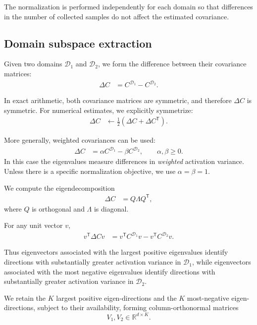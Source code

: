 \documentclass[11pt,a4paper]{article}
\begin{document}
The normalization is performed independently for each domain so that
differences in the number of collected samples do not affect the
estimated covariance.

\subsection{Domain subspace extraction}

Given two domains $\mathcal{D}_1$ and $\mathcal{D}_2$, we form the
difference between their covariance matrices:
\begin{align}
\Delta C
&=
C^{\mathcal{D}_1}
-
C^{\mathcal{D}_2}.
\end{align}

In exact arithmetic, both covariance matrices are symmetric, and
therefore $\Delta C$ is symmetric. For numerical estimates, we
explicitly symmetrize:
\begin{align}
\Delta C
&\leftarrow
\frac{1}{2}
\left(
\Delta C+\Delta C^{\mathsf T}
\right).
\end{align}

More generally, weighted covariances can be used:
\begin{align}
\Delta C
&=
\alpha C^{\mathcal{D}_1}
-
\beta C^{\mathcal{D}_2},
\qquad
\alpha,\beta\geq 0.
\end{align}
In this case the eigenvalues measure differences in
\emph{weighted} activation variance. Unless there is a specific
normalization objective, we use $\alpha=\beta=1$.

We compute the eigendecomposition
\begin{align}
\Delta C
&=
Q\Lambda Q^{\mathsf T},
\end{align}
where $Q$ is orthogonal and $\Lambda$ is diagonal.

For any unit vector $v$,
\begin{align}
v^{\mathsf T}\Delta C v
&=
v^{\mathsf T}C^{\mathcal{D}_1}v
-
v^{\mathsf T}C^{\mathcal{D}_2}v.
\end{align}

Thus eigenvectors associated with the largest positive eigenvalues
identify directions with substantially greater activation variance in
$\mathcal{D}_1$, while eigenvectors associated with the most negative
eigenvalues identify directions with substantially greater activation
variance in $\mathcal{D}_2$.

We retain the $K$ largest positive eigen-directions and the $K$
most-negative eigen-directions, subject to their availability, forming
column-orthonormal matrices
\[
V_1,V_2\in\mathbb{R}^{d\times K}.
\]
\end{document}
